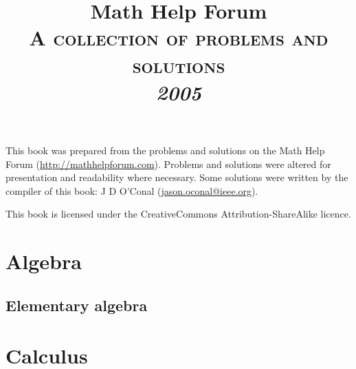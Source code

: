 \documentclass[a4paper,makeidx]{book}
\makeatletter
\renewcommand\tableofcontents{%
    \if@twocolumn
      \@restonecoltrue\onecolumn
    \else
      \@restonecolfalse
    \fi
    \chapter*{\contentsname}%
        \@mkboth{%
           \MakeUppercase\contentsname}{\MakeUppercase\contentsname}%
    \@starttoc{toc}%
    \if@restonecol\twocolumn\fi
    }
\makeatother
\begin{document}
	\title{Math Help Forum\\\vspace{12pt}\Large\textsc{A collection of problems and solutions}\vspace{24pt}\\\vspace{24pt}\Huge\textit{2005}}
	\author{}
	\date{}

	\maketitle

	This book was prepared from the problems and solutions on the Math Help Forum (\url{http://mathhelpforum.com}). Problems and solutions were altered for presentation and readability where necessary. Some solutions were written by the compiler of this book: J D O'Conal (\url{jason.oconal@ieee.org}).

	This book is licensed under the CreativeCommons Attribution-ShareAlike licence.

	\vspace{24pt}

	\begin{center}\Huge\bysa\normalsize\end{center}

    \tableofcontents

	\part{Algebra}

        \chapter{Elementary algebra}

            
            
            



	\part{Calculus}
\end{document}
